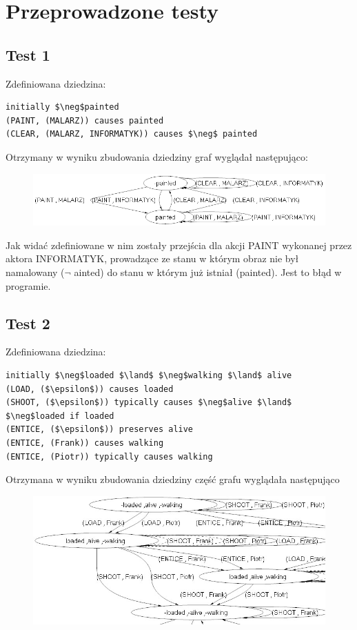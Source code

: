 \documentclass{article}
\begin{document}
\section{Przeprowadzone testy}
\subsection{Test 1}
Zdefiniowana dziedzina:
\bigskip
{}
\begin{lstlisting}[mathescape=true]
initially $\neg$painted
(PAINT, (MALARZ)) causes painted
(CLEAR, (MALARZ, INFORMATYK)) causes $\neg$ painted
\end{lstlisting}
\vspace{1cm}
Otrzymany w wyniku zbudowania dziedziny graf wyglądał następująco:

\begin{figure}[H]
\centering
\includegraphics[scale=0.6]{test1_graf}
\end{figure}

Jak widać zdefiniowane w nim zostały przejścia dla akcji PAINT wykonanej przez aktora INFORMATYK, prowadzące ze stanu w którym obraz nie był namalowany ($\neg$ ainted) do stanu w którym już istniał (painted). Jest to błąd w programie.

\newpage

\subsection{Test 2}
Zdefiniowana dziedzina:
\bigskip
{}
\begin{lstlisting}[mathescape=true]
initially $\neg$loaded $\land$ $\neg$walking $\land$ alive
(LOAD, ($\epsilon$)) causes loaded
(SHOOT, ($\epsilon$)) typically causes $\neg$alive $\land$ $\neg$loaded if loaded
(ENTICE, ($\epsilon$)) preserves alive
(ENTICE, (Frank)) causes walking
(ENTICE, (Piotr)) typically causes walking
\end{lstlisting}
\vspace{1cm}
Otrzymana w wyniku zbudowania dziedziny część grafu wyglądała następująco

\begin{figure}[H]
	\centering
	\includegraphics[scale=0.5]{test2_graf}
\end{figure}
\end{document}
